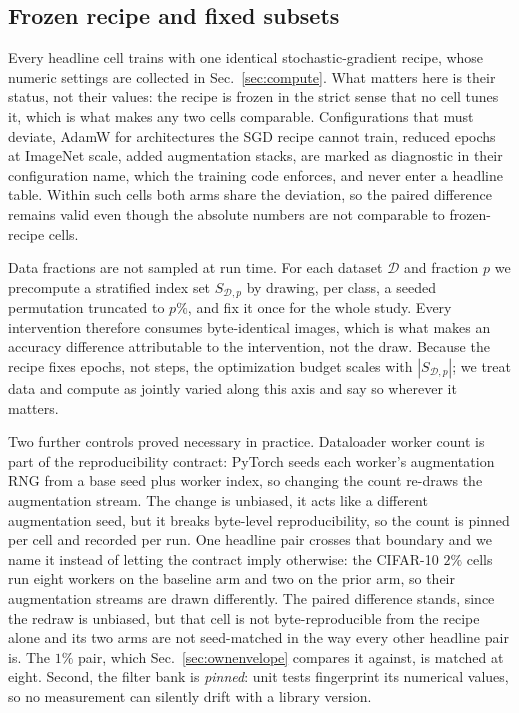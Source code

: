\subsection{Frozen recipe and fixed subsets}\label{sec:recipe}
Every headline cell trains with one identical stochastic-gradient recipe,
whose numeric settings are collected in
Sec.~\ref{sec:compute}. What matters here is their status, not their
values: the recipe is frozen in the
strict sense that no cell tunes it, which is what makes any two cells
comparable. Configurations that must deviate, AdamW
\citep{loshchilov2019adamw} for architectures the SGD recipe cannot train,
reduced epochs at ImageNet scale, added augmentation stacks, are marked as
diagnostic in their configuration name, which the training code enforces, and
never enter a headline table. Within such cells both arms share the deviation,
so the paired difference remains valid even though the absolute numbers are not
comparable to frozen-recipe cells.

Data fractions are not sampled at run time. For each dataset $\mathcal{D}$ and
fraction $p$ we precompute a stratified index set $S_{\mathcal{D},p}$ by
drawing, per class, a seeded permutation truncated to $p\%$, and fix it once
for the whole study. Every intervention therefore consumes byte-identical
images, which is what makes an accuracy difference attributable to the
intervention, not the draw. Because the recipe fixes epochs, not steps, the
optimization budget scales with $|S_{\mathcal{D},p}|$; we treat data and
compute as jointly varied along this axis and say so wherever it matters.

 Two further controls proved necessary in practice. Dataloader worker count is
part of the reproducibility contract: PyTorch seeds each worker's augmentation
RNG from a base seed plus worker index, so changing the count re-draws the
augmentation stream. The change is unbiased, it acts like a different
augmentation seed, but it breaks byte-level reproducibility, so the count is
pinned per cell and recorded per run. One headline pair crosses that boundary
and we name it instead of letting the contract imply otherwise: the CIFAR-10
$2\%$ cells run eight workers on the baseline arm and two on the prior arm, so
their augmentation streams are drawn differently. The paired difference stands,
since the redraw is unbiased, but that cell is not byte-reproducible from the
recipe alone and its two arms are not seed-matched in the way every other
headline pair is. The $1\%$ pair, which Sec.~\ref{sec:ownenvelope} compares
it against, is matched at eight. Second, the filter bank is \emph{pinned}:
unit tests fingerprint its numerical values, so no measurement can silently
drift with a library version.

